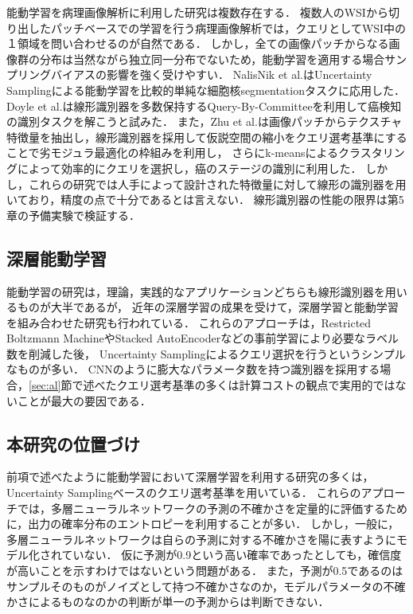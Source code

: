 能動学習を病理画像解析に利用した研究は複数存在する．
複数人のWSIから切り出したパッチベースでの学習を行う病理画像解析では，クエリとしてWSI中の１領域を問い合わせるのが自然である．
しかし，全ての画像パッチからなる画像群の分布は当然ながら独立同一分布でないため，能動学習を適用する場合サンプリングバイアスの影響を強く受けやすい．
NalisNik et al.はUncertainty Samplingによる能動学習を比較的単純な細胞核segmentationタスクに応用した\cite{nalisnik2017interactive}．
Doyle et al.は線形識別器を多数保持するQuery-By-Committeeを利用して癌検知の識別タスクを解こうと試みた\cite{doyle2011active}．
また，Zhu et al.は画像パッチからテクスチャ特徴量を抽出し，線形識別器を採用して仮説空間の縮小をクエリ選考基準にすることで劣モジュラ最適化の枠組みを利用し，
さらにk-meansによるクラスタリングによって効率的にクエリを選択し，癌のステージの識別に利用した\cite{zhu2014scalable}．
しかし，これらの研究では人手によって設計された特徴量に対して線形の識別器を用いており，精度の点で十分であるとは言えない．
線形識別器の性能の限界は第5章の予備実験で検証する．

\subsection{深層能動学習}
能動学習の研究は，理論，実践的なアプリケーションどちらも線形識別器を用いるものが大半であるが，
近年の深層学習の成果を受けて，深層学習と能動学習を組み合わせた研究も行われている\cite{6889457, li2016active}．
これらのアプローチは，Restricted Boltzmann MachineやStacked AutoEncoderなどの事前学習により必要なラベル数を削減した後，
Uncertainty Samplingによるクエリ選択を行うというシンプルなものが多い．
CNNのように膨大なパラメータ数を持つ識別器を採用する場合，\ref{sec:al}節で述べたクエリ選考基準の多くは計算コストの観点で実用的ではないことが最大の要因である．

\subsection{本研究の位置づけ}
前項で述べたように能動学習において深層学習を利用する研究の多くは，Uncertainty Samplingベースのクエリ選考基準を用いている．
これらのアプローチでは，多層ニューラルネットワークの予測の不確かさを定量的に評価するために，出力の確率分布のエントロピーを利用することが多い．
しかし，一般に，多層ニューラルネットワークは自らの予測に対する不確かさを陽に表すようにモデル化されていない．
仮に予測が0.9という高い確率であったとしても，確信度が高いことを示すわけではないという問題がある．
また，予測が0.5であるのはサンプルそのものがノイズとして持つ不確かさなのか，モデルパラメータの不確かさによるものなのかの判断が単一の予測からは判断できない．

